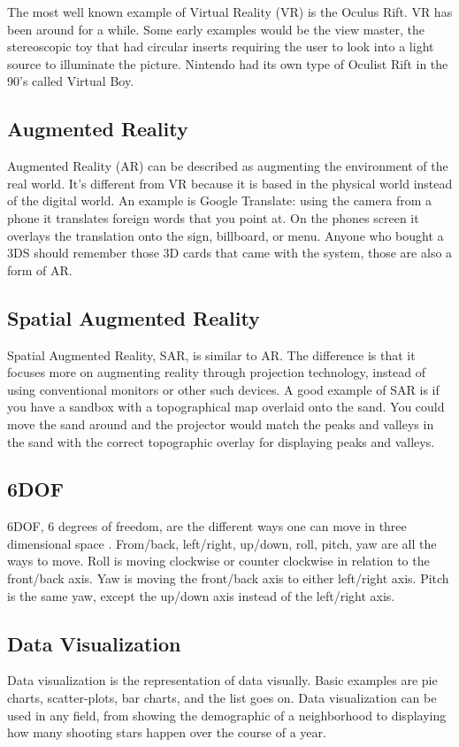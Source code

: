 \documentclass{sig-alternate}
\begin{document}
The most well known example of Virtual Reality (VR) is the Oculus Rift. VR has been around for a while. Some early examples would be the view master, the stereoscopic toy that had circular inserts requiring the user to look into a light source to illuminate the picture. Nintendo had its own type of Oculist Rift in the 90's called Virtual Boy.      

\subsection{Augmented Reality}
\label{sec:Augmented Reality}
Augmented Reality (AR) can be described as augmenting the environment of the real world. It's different from VR because it is based in the physical world instead of the digital world. An example is Google Translate: using the camera from a phone it translates foreign words that you point at. On the phones screen it overlays the translation onto the sign, billboard, or menu. Anyone who bought a 3DS should remember those 3D cards that came with the system, those are also a form of AR. 

\subsection{Spatial Augmented Reality}
\label{sec:Spatial Augmented Reality}
Spatial Augmented Reality, SAR, is similar to AR. The difference is that it focuses more on augmenting reality through projection technology, instead of using conventional monitors or other such devices. A good example of SAR is if you have a sandbox with a topographical map overlaid onto the sand. You could move the sand around and the projector would match the peaks and valleys in the sand with the correct topographic overlay for displaying peaks and valleys.  

\subsection{6DOF}
\label{sec:6DOF}
6DOF, 6 degrees of freedom, are the different ways one can move in three dimensional space . From/back, left/right, up/down, roll, pitch, yaw are all the ways to move. Roll is moving clockwise or counter clockwise in relation to the front/back axis. Yaw is moving the front/back axis to either left/right axis. Pitch is the same yaw, except the up/down axis instead of the left/right axis.

\subsection{Data Visualization}
\label{sec:Data Visualization}
Data visualization is the representation of data visually. Basic examples are pie charts, scatter-plots, bar charts, and the list goes on. Data visualization can be used in any field, from showing the demographic of a neighborhood to displaying how many shooting stars happen over the course of a year.  
\end{document}

